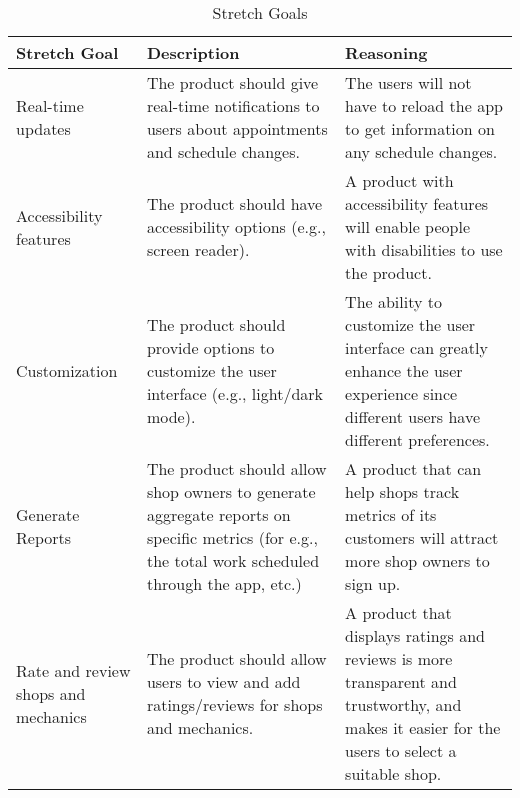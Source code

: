 \documentclass{article}
\begin{document}
\begin{center}
    \begin{longtable}{ | p{3cm} | p{4cm} | p{4.5cm} |}
    \caption{Stretch Goals}
    \label{tab:stretchGoals}
    \\ \hline
    \textbf{Stretch Goal} & \textbf{Description} & \textbf{Reasoning} \\ \hline
    Real-time updates & 
    The product should give real-time notifications to users about appointments and schedule changes. &  
    The users will not have to reload the app to get information on any schedule changes.
\\ \hline

    Accessibility features & 
    The product should have accessibility options (e.g., screen reader).  &  
    A product with accessibility features will enable people with disabilities to use the product.
\\ \hline

    Customization & 
    The product should provide options to customize the user interface (e.g., light/dark mode).  &  
    The ability to customize the user interface can greatly enhance the user experience since different users have different preferences.
\\ \hline

    Generate Reports & 
    The product should allow shop owners to generate aggregate reports on specific metrics (for e.g., the total work scheduled through the app, etc.)   &  
    A product that can help shops track metrics of its customers will attract more shop owners to sign up.
\\ \hline

    Rate and review shops and mechanics & 
    The product should allow users to view and add ratings/reviews for shops and mechanics.  &  
    A product that displays ratings and reviews is more transparent and trustworthy, and makes it easier for the users to select a suitable shop.
    \\ \hline
    \end{longtable}
\end{center}
\end{document}
